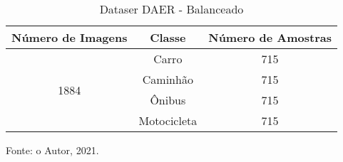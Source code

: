 
\begin{table}[htp]
\centering
\caption{Dataser DAER - Balanceado}
\label{tab:daer_dataset_balanced}
{%
\begin{tabular}{ccc}
\hline
\multicolumn{1}{l}{\textbf{Número de Imagens}} & \textbf{Classe} & \textbf{Número de Amostras} \\ \hline
\multicolumn{1}{c}{\multirow{4}{*}{1884}}     & Carro           & 715                        \\
\multicolumn{1}{c}{}                          & Caminhão        & 715                        \\
\multicolumn{1}{c}{}                          & Ônibus          & 715                         \\
\multicolumn{1}{c}{}                          & Motocicleta     & 715                         \\ \cline{1-3} 
\end{tabular}%

Fonte: o Autor, 2021.
}
\end{table}